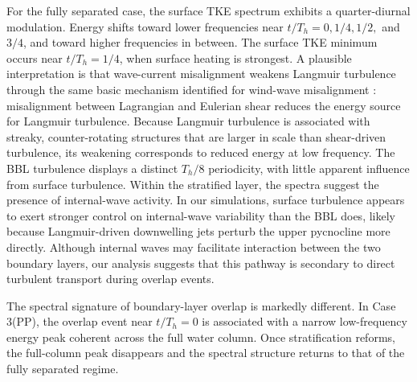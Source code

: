 \documentclass[draft]{agujournal2019}
\let\cite\shortcite
\begin{document}
For the fully separated case, the surface TKE spectrum exhibits a quarter-diurnal modulation. Energy shifts toward lower frequencies near $t/T_h = 0, 1/4, 1/2,$ and $3/4$, and toward higher frequencies in between. The surface TKE minimum occurs near $t/T_h = 1/4$, when surface heating is strongest. A plausible interpretation is that wave-current misalignment weakens Langmuir turbulence through the same basic mechanism identified for wind-wave misalignment \cite{Wang2019, Wang2022}: misalignment between Lagrangian and Eulerian shear reduces the energy source for Langmuir turbulence. Because Langmuir turbulence is associated with streaky, counter-rotating structures that are larger in scale than shear-driven turbulence, its weakening corresponds to reduced energy at low frequency. The BBL turbulence displays a distinct $T_h/8$ periodicity, with little apparent influence from surface turbulence.  Within the stratified layer, the spectra suggest the presence of internal-wave activity. In our simulations, surface turbulence appears to exert stronger control on internal-wave variability than the BBL does, likely because Langmuir-driven downwelling jets perturb the upper pycnocline more directly. Although internal waves may facilitate interaction between the two boundary layers, our analysis suggests that this pathway is secondary to direct turbulent transport during overlap events.

The spectral signature of boundary-layer overlap is markedly different. In Case 3(PP), the overlap event near $t/T_h=0$ is associated with a narrow low-frequency energy peak coherent across the full water column.  Once stratification reforms, the full-column peak disappears and the spectral structure returns to that of the fully separated regime.
\end{document}
